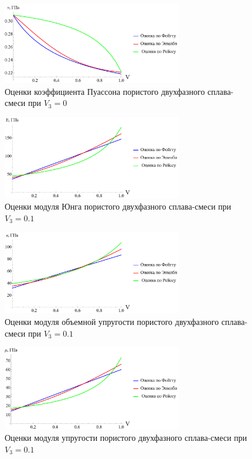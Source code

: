 \documentclass[12pt, a4paper]{article}
\begin{document}
\begin{figure}[!htbp]
	\centering
	\includegraphics[width=0.7\textwidth]{v-p-1}%
	\caption{Оценки коэффициента Пуассона пористого двухфазного сплава-смеси при $V_3 = 0$}
	\vspace*{-2mm}
	\label{puasson-pic-p-1}
\end{figure}
\begin{figure}[!htbp]
	\centering
	\includegraphics[width=0.7\textwidth]{e-p-2}%
	\caption{Оценки модуля Юнга пористого двухфазного сплава-смеси при $V_3 = 0.1$}
	\vspace*{-2mm}
	\label{puasson-pic-p-1}
\end{figure}
\begin{figure}[!htbp]
	\centering
	\includegraphics[width=0.7\textwidth]{k-p-2}%
	\caption{Оценки модуля объемной упругости пористого двухфазного сплава-смеси при $V_3 = 0.1$}
	\vspace*{-2mm}
	\label{puasson-pic-p-1}
\end{figure}
\begin{figure}[!htbp]
	\centering
	\includegraphics[width=0.7\textwidth]{nu-p-2}%
	\caption{Оценки модуля упругости пористого двухфазного сплава-смеси при $V_3 = 0.1$}
	\vspace*{-2mm}
	\label{puasson-pic-p-1}
\end{figure}
\end{document}
